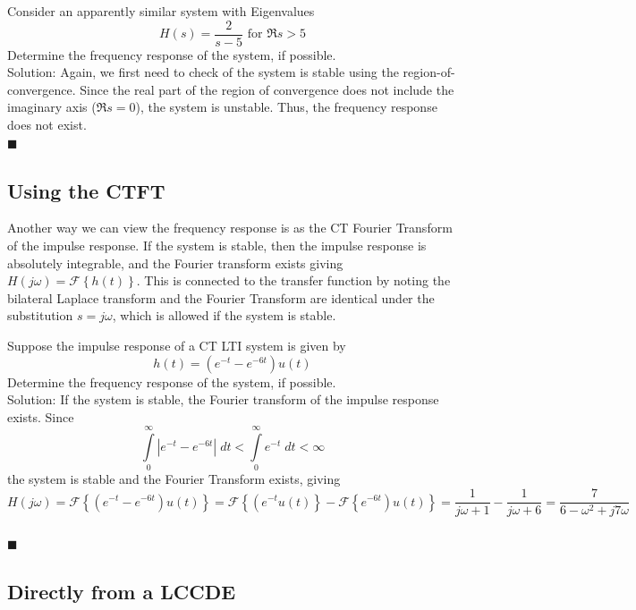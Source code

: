 \begin{example} Consider an apparently similar system with Eigenvalues
  \[
  H(s) = \frac{2}{s-5}\mbox{ for } \Re{s} > 5
  \]
  Determine the frequency response of the system, if possible.\\

  Solution: Again, we first need to check of the system is stable using the region-of-convergence. Since the real part of the region of convergence does not include the imaginary axis ($\Re s = 0$), the system is unstable. Thus, the frequency response does not exist.
  \\$\blacksquare$
\end{example}

\subsection*{Using the CTFT}

Another way we can view the frequency response is as the CT Fourier Transform of the impulse response. If the system is stable, then the impulse response is absolutely integrable, and the Fourier transform exists giving $H(j\omega) = \mathcal{F}\left\{h(t)\right\}$. This is connected to the transfer function by noting the bilateral Laplace transform and the Fourier Transform are identical under the substitution $s = j\omega$, which is allowed if the system is stable.

\begin{example} Suppose the impulse response of a CT LTI system is given by
  \[
  h(t) = \left(e^{-t}-e^{-6t}\right)u(t) 
  \]
  Determine the frequency response of the system, if possible.\\

  Solution: If the system is stable, the Fourier transform of the impulse response exists. Since
  \[
  \int\limits_{0}^{\infty} \left| e^{-t}-e^{-6t} \right| \; dt < \int\limits_{0}^{\infty} e^{-t} \; dt < \infty 
  \]
  the system is stable and the Fourier Transform exists, giving
  \[
H(j\omega) = \mathcal{F}\left\{ \left(e^{-t}-e^{-6t}\right)u(t) \right\} = \mathcal{F}\left\{ \left(e^{-t}u(t) \right\} - \mathcal{F}\left\{e^{-6t}\right)u(t) \right\} = \frac{1}{j\omega + 1} - \frac{1}{j\omega + 6} = \frac{7}{6-\omega^2 + j7\omega}
\]\\
$\blacksquare$
\end{example}

\subsection*{Directly from a LCCDE}

